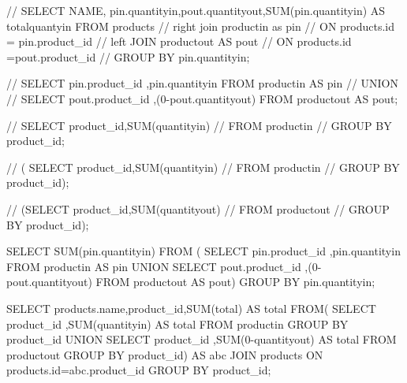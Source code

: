 
// SELECT NAME, pin.quantityin,pout.quantityout,SUM(pin.quantityin) AS totalquantyin FROM products
// right join productin as pin
// ON products.id = pin.product_id
// left JOIN productout AS pout
// ON products.id =pout.product_id
// GROUP BY pin.quantityin;



// SELECT pin.product_id ,pin.quantityin FROM productin AS pin
// UNION
// SELECT pout.product_id ,(0-pout.quantityout) FROM	productout AS pout;



// SELECT product_id,SUM(quantityin) 
// FROM productin
// GROUP BY product_id;


// ( SELECT product_id,SUM(quantityin) 
//  FROM productin
//  GROUP BY product_id);


// (SELECT product_id,SUM(quantityout)
// FROM productout
// GROUP BY product_id);

 SELECT SUM(pin.quantityin) FROM (
 SELECT pin.product_id ,pin.quantityin FROM productin AS pin
 UNION
 SELECT pout.product_id ,(0-pout.quantityout) FROM	productout AS pout)
 GROUP BY pin.quantityin;



 SELECT products.name,product_id,SUM(total) AS total FROM(
SELECT product_id ,SUM(quantityin) AS total FROM productin 
GROUP BY product_id
UNION 
SELECT product_id ,SUM(0-quantityout) AS total FROM	productout 
GROUP BY product_id) AS abc
JOIN products
ON products.id=abc.product_id
GROUP BY product_id;